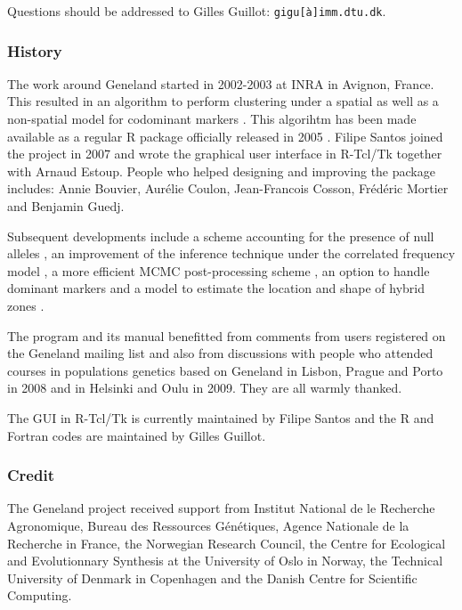 \documentclass[a4paper,10pt]{article}
\begin{document}
Questions should be addressed to Gilles Guillot: \texttt{gigu[\`a]imm.dtu.dk}.


\subsubsection{History}
The work around {\sc Geneland} started in 2002-2003  at INRA in Avignon, France. 
This resulted in an algorithm to perform clustering under a spatial as well as a non-spatial model 
for codominant markers \citep{Guillot05a}. 
This algorihtm has been made available as a regular R package officially released in 2005 \citep{Guillot05c}. 
Filipe Santos joined the project in 2007 and wrote  the gra\-phical user interface in R-Tcl/Tk together with Arnaud Estoup.
People who helped designing and improving the package includes:  
Annie Bouvier, Aur\'elie Coulon, Jean-Francois Cosson, Fr\'ed\'eric Mortier and Benjamin Guedj. 


Subsequent developments include a scheme accounting for the presence of null alleles \citep{Guillot08a}, 
an improvement of the  inference technique under the correlated frequency model \citep{Guillot08b}, 
a more efficient MCMC post-processing scheme \citep{Guillot08b}, 
an option to handle dominant markers \citep{Guillot10b} and a model to estimate the location and shape of hybrid zones \citep{Guedj11}.

The program and its manual benefitted from comments from users registered on the {\sc Geneland} mailing list and also 
from discussions with people who attended courses in populations genetics based on {\sc Geneland} 
in Lisbon, Prague and  Porto in 2008 and in Helsinki and Oulu in 2009. They are all warmly thanked.

The GUI in R-Tcl/Tk is currently maintained by Filipe Santos and the  R and Fortran codes are maintained by Gilles Guillot.

\subsubsection{Credit}
The {\sc Geneland} project received support from Institut National de le Recherche Agronomique, Bureau des Ressources G\'en\'etiques, 
Agence Nationale de la Recherche in France,  
the Norwegian Research Council, the Centre for Ecological and Evolutionnary Synthesis at the University of Oslo in Norway, 
the Technical University of Denmark in Copenhagen and the Danish Centre for Scientific Computing. 
\end{document}

